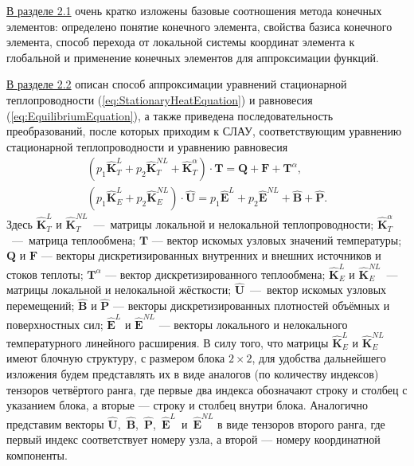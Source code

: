 \underline{В разделе 2.1} очень кратко изложены базовые соотношения метода конечных элементов: определено понятие конечного элемента, свойства базиса конечного элемента, способ перехода от локальной системы координат элемента к глобальной и применение конечных элементов для аппроксимации функций.

\underline{В разделе 2.2} описан способ аппроксимации уравнений стационарной теплопроводности (\ref{eq:StationaryHeatEquation}) и равновесия (\ref{eq:EquilibriumEquation}), а также приведена последовательность преобразований, после которых приходим к СЛАУ, соответствующим уравнению стационарной теплопроводности и уравнению равновесия
\begin{gather}
	\label{eq:ThermalSLAE}
	\left( p_1 \widehat{\textbf{K}}^L_T + p_2 \widehat{\textbf{K}}^{NL}_T + \widehat{\textbf{K}}^{\alpha}_T \right) \cdot \textbf{T} = \textbf{Q} + \textbf{F} + \textbf{T}^{\alpha},
\\
	\label{eq:StressSLAE}
	\left( p_1 \widehat{\textbf{K}}^L_E + p_2 \widehat{\textbf{K}}^{NL}_E \right) \cdot \widehat{\textbf{U}} = p_1 \widehat{\textbf{E}}^L + p_2 \widehat{\textbf{E}}^{NL} + \widehat{\textbf{B}} + \widehat{\textbf{P}}.
\end{gather}
Здесь $\widehat{\textbf{K}}^L_T$ и $\widehat{\textbf{K}}^{NL}_T$~---~матрицы локальной и нелокальной теплопроводности;
$\widehat{\textbf{K}}^{\alpha}_T$~---~матрица теплообмена;
$\textbf{T}$ --- вектор искомых узловых значений температуры;
$\textbf{Q}$ и $\textbf{F}$ --- векторы дискретизированных внутренних и внешних источников и стоков теплоты;
$\textbf{T}^{\alpha}$ --- вектор дискретизированного теплообмена;
$\widehat{\textbf{K}}^L_E$ и $\widehat{\textbf{K}}^{NL}_E$~--- матрицы локальной и нелокальной жёсткости;
$\widehat{\textbf{U}}$~---~вектор искомых узловых перемещений;
$\widehat{\textbf{B}}$ и $\widehat{\textbf{P}}$ --- векторы дискретизированных плотностей объёмных и поверхностных сил;
$\widehat{\textbf{E}}^L$ и $\widehat{\textbf{E}}^{NL}$ --- векторы локального и нелокального температурного линейного расширения.
В силу того, что матрицы $\widehat{\textbf{K}}^L_E$ и $\widehat{\textbf{K}}^{NL}_E$ имеют блочную структуру, с размером блока $2 \times 2$, для удобства дальнейшего изложения будем представлять их в виде аналогов (по количеству индексов) тензоров четвёртого ранга, где первые два индекса обозначают строку и столбец с указанием блока, а вторые --- строку и столбец внутри блока.
Аналогично представим векторы \mbox{$\widehat{\textbf{U}}$, $\widehat{\textbf{B}}$, $\widehat{\textbf{P}}$, $\widehat{\textbf{E}}^L$ и $\widehat{\textbf{E}}^{NL}$} в виде тензоров второго ранга, где первый индекс соответствует номеру узла, а второй --- номеру координатной компоненты.

